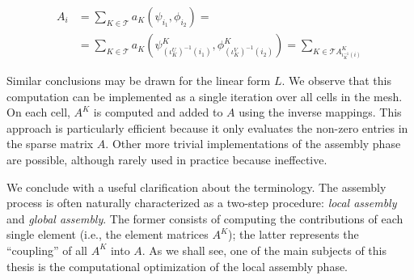 \begin{equation}
\begin{split}
A_i & = \sum_{K \in \mathcal{T}} a_K (\psi_{i_1},\phi_{i_2}) = \\
& = \sum_{K \in \mathcal{T}} a_K(\psi_{(\iota_K^U)^{-1}(i_1)}^K, \phi_{(\iota_K^V)^{-1}(i_2)}^K) = \sum_{K \in \mathcal{T} A_{\iota_K^{-1}(i)}^K}
\end{split}
\end{equation} 

Similar conclusions may be drawn for the linear form $L$. We observe that this computation can be implemented as a single iteration over all cells in the mesh. On each cell, $A^K$ is computed and added to $A$ using the inverse mappings. This approach is particularly efficient because it only evaluates the non-zero entries in the sparse matrix $A$. Other more trivial implementations of the assembly phase are possible, although rarely used in practice because ineffective. 

We conclude with a useful clarification about the terminology. The assembly process is often naturally characterized as a two-step procedure: {\em local assembly}  and {\em global assembly}. The former consists of computing the contributions of each single element (i.e., the element matrices $A^K$); the latter represents the ``coupling'' of all $A^K$ into $A$. As we shall see, one of the main subjects of this thesis is the computational optimization of the local assembly phase.

